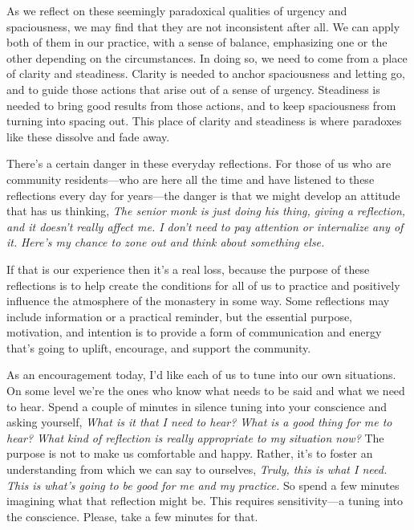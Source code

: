 As we reflect on these seemingly paradoxical qualities of urgency and 
spaciousness, we may find that they are not inconsistent after all. We 
can apply both of them in our practice, with a sense of balance, 
emphasizing one or the other depending on the circumstances. In doing 
so, we need to come from a place of clarity and steadiness. Clarity is 
needed to anchor spaciousness and letting go, and to guide those 
actions that arise out of a sense of urgency. Steadiness is needed to 
bring good results from those actions, and to keep spaciousness from 
turning into spacing out. This place of clarity and steadiness is where 
paradoxes like these dissolve and fade away.


There's a certain danger in these everyday reflections. For those of us 
who are community residents---who are here all the time and have 
listened to these reflections every day for years---the danger is that 
we might develop an attitude that has us thinking, \emph{The senior 
monk is just doing his thing, giving a reflection, and it doesn't 
really affect me. I don't need to pay attention or internalize any of 
it.} \emph{Here's my chance to zone out and think about something else.}

If that is our experience then it's a real loss, because the purpose of 
these reflections is to help create the conditions for all of us to 
practice and positively influence the atmosphere of the monastery in 
some way. Some reflections may include information or a practical 
reminder, but the essential purpose, motivation, and intention is to 
provide a form of communication and energy that's going to uplift, 
encourage, and support the community.

As an encouragement today, I'd like each of us to tune into our own 
situations. On some level we're the ones who know what needs to be said 
and what we need to hear. Spend a couple of minutes in silence tuning 
into your conscience and asking yourself, \emph{What is it that I need 
to hear? What is a good thing for me to hear? What kind of reflection 
is really appropriate to my situation now?} The purpose is not to make 
us comfortable and happy. Rather, it's to foster an understanding from 
which we can say to ourselves, \emph{Truly, this is what I need. This 
is what's going to be good for me and my practice.} So spend a few 
minutes imagining what that reflection might be. This requires 
sensitivity---a tuning into the conscience. Please, take a few minutes 
for that.

